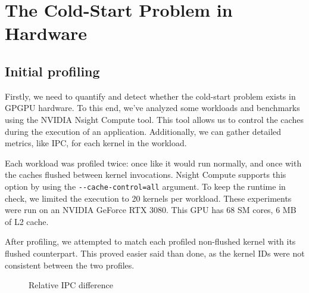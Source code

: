 \chapter{The Cold-Start Problem in Hardware}\label{ch:hw-analysis}

\section{Initial profiling}\label{sec:initial-profiling}
Firstly, we need to quantify and detect whether the cold-start problem exists in GPGPU hardware.
To this end, we've analyzed some workloads and benchmarks using the NVIDIA Nsight Compute tool.
This tool allows us to control the caches during the execution of an application.
Additionally, we can gather detailed metrics, like IPC, for each kernel in the workload.

Each workload was profiled twice: once like it would run normally, and once with the caches flushed between kernel invocations.
Nsight Compute supports this option by using the \verb|--cache-control=all| argument.
To keep the runtime in check, we limited the execution to 20 kernels per workload.
These experiments were run on an NVIDIA GeForce RTX 3080\cite{nvidia-wp}.
This GPU has 68 SM cores, 6 MB of L2 cache.

After profiling, we attempted to match each profiled non-flushed kernel with its flushed counterpart.
This proved easier said than done, as the kernel IDs were not consistent between the two profiles.

\begin{figure}
    \centering
    \resizebox{0.45\textwidth}{!}{}
    \resizebox{0.45\textwidth}{!}{}
    \caption{Relative IPC difference}
    \label{fig:ipc_diff}
\end{figure}

